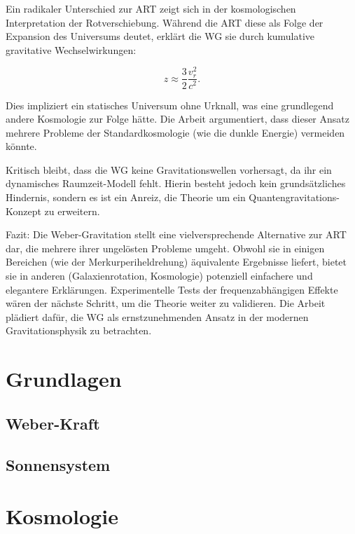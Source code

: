 \documentclass{book}
\numberwithin{equation}{section}
\begin{document}
Ein radikaler Unterschied zur ART zeigt sich in der kosmologischen Interpretation der Rotverschiebung. Während die ART diese als Folge der Expansion des Universums deutet,
erklärt die WG sie durch kumulative gravitative Wechselwirkungen:

\[
z \approx \frac{3}{2} \frac{v_r^2}{c^2}.
\]  

Dies impliziert ein statisches Universum ohne Urknall, was eine grundlegend andere Kosmologie zur Folge hätte. Die Arbeit argumentiert, dass dieser Ansatz mehrere Probleme
der Standardkosmologie (wie die dunkle Energie) vermeiden könnte.  

Kritisch bleibt, dass die WG keine Gravitationswellen vorhersagt, da ihr ein dynamisches Raumzeit-Modell fehlt. Hierin besteht jedoch kein grundsätzliches Hindernis,
sondern es ist ein Anreiz, die Theorie um ein Quantengravitations-Konzept zu erweitern.

Fazit: Die Weber-Gravitation stellt eine vielversprechende Alternative zur ART dar, die mehrere ihrer ungelösten Probleme umgeht. Obwohl sie in einigen Bereichen
(wie der Merkurperiheldrehung) äquivalente Ergebnisse liefert, bietet sie in anderen (Galaxienrotation, Kosmologie) potenziell einfachere und elegantere Erklärungen.
Experimentelle Tests der frequenzabhängigen Effekte wären der nächste Schritt, um die Theorie weiter zu validieren. Die Arbeit plädiert dafür, die WG als
ernstzunehmenden Ansatz in der modernen Gravitationsphysik zu betrachten.

\tableofcontents

\part{Grundlagen}
\chapter{Weber-Kraft}
\label{chapter:weber_kraft}





\chapter{Sonnensystem}
\label{chapter:sonnensystem}



\part{Kosmologie}



\end{document}
